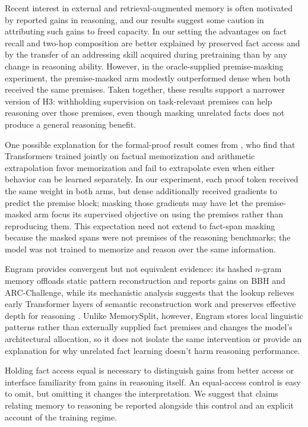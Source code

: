 \documentclass{article}
\begin{document}
Recent interest in external and retrieval-augmented memory is often motivated by reported gains in reasoning, and our results suggest some caution in attributing such gains to freed capacity. In our setting the advantages on fact recall and two-hop composition are better explained by preserved fact access and by the transfer of an addressing skill acquired during pretraining than by any change in reasoning ability. However, in the oracle-supplied premise-masking experiment, the premise-masked arm modestly outperformed dense when both received the same premises. Taken together, these results support a narrower version of H3: withholding supervision on task-relevant premises can help reasoning over those premises, even though masking unrelated facts does not produce a general reasoning benefit.

One possible explanation for the formal-proof result comes from \citet{barron2025toobig}, who find that Transformers trained jointly on factual memorization and arithmetic extrapolation favor memorization and fail to extrapolate even when either behavior can be learned separately. In our experiment, each proof token received the same weight in both arms, but dense additionally received gradients to predict the premise block; masking those gradients may have let the premise-masked arm focus its supervised objective on using the premises rather than reproducing them. This expectation need not extend to fact-span masking because the masked spans were not premises of the reasoning benchmarks; the model was not trained to memorize and reason over the same information.

Engram provides convergent but not equivalent evidence: its hashed $n$-gram memory offloads static pattern reconstruction and reports gains on BBH and ARC-Challenge, while its mechanistic analysis suggests that the lookup relieves early Transformer layers of semantic reconstruction work and preserves effective depth for reasoning \citep{cheng2026engram}. Unlike MemorySplit, however, Engram stores local linguistic patterns rather than externally supplied fact premises and changes the model's architectural allocation, so it does not isolate the same intervention or provide an explanation for why unrelated fact learning doesn't harm reasoning performance.

Holding fact access equal is necessary to distinguish gains from better access or interface familiarity from gains in reasoning itself. An equal-access control is easy to omit, but omitting it changes the interpretation. We suggest that claims relating memory to reasoning be reported alongside this control and an explicit account of the training regime.
\end{document}
